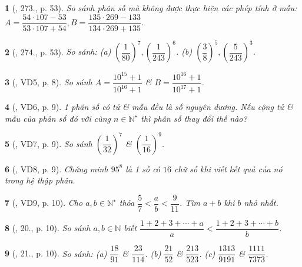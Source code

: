 \documentclass{article}
\newtheorem{baitoan}{}
\begin{document}
\begin{baitoan}[\cite{Tuyen_Toan_6}, 273., p. 53]
	So sánh phân số mà không được thực hiện các phép tính ở mẫu: $A = \dfrac{54\cdot107 - 53}{53\cdot107 + 54},B = \dfrac{135\cdot269 - 133}{134\cdot269 + 135}$.
\end{baitoan}

\begin{baitoan}[\cite{Tuyen_Toan_6}, 274., p. 53]
	So sánh: (a) $\left(\dfrac{1}{80}\right)^7,\left(\dfrac{1}{243}\right)^6$. (b) $\left(\dfrac{3}{8}\right)^5,\left(\dfrac{5}{243}\right)^3$.
\end{baitoan}

\begin{baitoan}[\cite{Binh_Toan_6_tap_2}, VD5, p. 8]
	So sánh $A = \dfrac{10^{15} + 1}{10^{16} + 1}$ \& $B = \dfrac{10^{16} + 1}{10^{17} + 1}$.
\end{baitoan}

\begin{baitoan}[\cite{Binh_Toan_6_tap_2}, VD6, p. 9]
	1 phân số có tử \& mẫu đều là số nguyên dương. Nếu cộng tử \& mẫu của phân số đó với cùng $n\in\mathbb{N}^\star$ thì phân số thay đổi thế nào?
\end{baitoan}

\begin{baitoan}[\cite{Binh_Toan_6_tap_2}, VD7, p. 9]
	So sánh $\left(\dfrac{1}{32}\right)^7$ \& $\left(\dfrac{1}{16}\right)^9$.
\end{baitoan}

\begin{baitoan}[\cite{Binh_Toan_6_tap_2}, VD8, p. 9]
	Chứng minh $95^8$ là 1 số có $16$ chữ số khi viết kết quả của nó trong hệ thập phân.
\end{baitoan}

\begin{baitoan}[\cite{Binh_Toan_6_tap_2}, VD9, p. 10]
	Cho $a,b\in\mathbb{N}^\star$ thỏa $\dfrac{5}{7} < \dfrac{a}{b} < \dfrac{9}{11}$. Tìm $a + b$ khi $b$ nhỏ nhất.
\end{baitoan}

\begin{baitoan}[\cite{Binh_Toan_6_tap_2}, 20., p. 10]
	So sánh $a,b\in\mathbb{N}$ biết $\dfrac{1 + 2 + 3 + \cdots + a}{a} < \dfrac{1 + 2 + 3 + \cdots + b}{b}$.
\end{baitoan}

\begin{baitoan}[\cite{Binh_Toan_6_tap_2}, 21., p. 10]
	So sánh: (a) $\dfrac{18}{91}$ \& $\dfrac{23}{114}$. (b) $\dfrac{21}{52}$ \& $\dfrac{213}{523}$. (c) $\dfrac{1313}{9191}$ \& $\dfrac{1111}{7373}$.
\end{baitoan}
\end{document}
